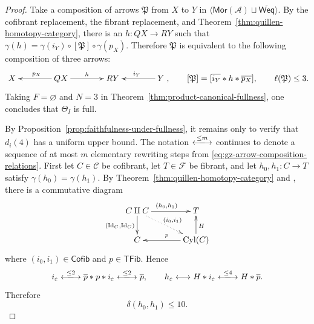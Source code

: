 \documentclass[10pt,a4paper]{amsart}
\theoremstyle{plain}
\theoremstyle{definition}
\theoremstyle{remark}
\begin{document}
\begin{proof}
  Take a composition of arrows $\mathfrak P$ from $X$ to $Y$ in $\langle\mathsf{Mor}(\mathcal A)\sqcup\overline{\mathsf{Weq}}\rangle$.
  By the cofibrant replacement, the fibrant replacement, and Theorem~\ref{thm:quillen-homotopy-category}, there is an $h:QX\longrightarrow RY$ such that $\gamma(h)=\gamma(i_Y)\circ[\mathfrak P]\circ\gamma(p_X)$.
  Therefore $\mathfrak P$ is equivalent to the following composition of three arrows:
  \[
    \xymatrix@C=14mm{
    X&
    QX\ar[l]_{p_X}\ar[r]^h&
    RY&
    Y\ar[l]_{i_Y}
    },
    \qquad
  [\mathfrak P]=[\overline{i_Y}\ast h\ast\overline{p_X}],
    \qquad
    \ell(\mathfrak P)\leq3.
  \]
  Taking $F=\varnothing$ and $N=3$ in Theorem~\ref{thm:product-canonical-fullness}, one concludes that $\Theta_I$ is full.

  \medskip

  By Proposition~\ref{prop:faithfulness-under-fullness}, it remains only to verify that $d_i(4)$ has a uniform upper bound.
  The notation $\xlongleftrightarrow{\leq m}$ continues to denote a sequence of at most $m$ elementary rewriting steps from \eqref{eq:gz-arrow-composition-relations}.
  First let $C \in \mathcal{C}$ be cofibrant, let $T \in \mathcal{F}$ be fibrant, and let $h_0,h_1:C\longrightarrow T$ satisfy $\gamma(h_0)=\gamma(h_1)$.
  By Theorem~\ref{thm:quillen-homotopy-category} and \cite[Lemma~4.6]{DwyerSpalinski}, there is a commutative diagram
  \[
    \xymatrix@C=12mm@R=7mm{
    C\amalg C\ar[r]^{(h_0, h_1)}\ar[d]_{(\operatorname{Id}_C, \operatorname{Id}_C)} \ar@{..>}[dr]^{(i_0, i_1)} &T\\
    C&\operatorname{Cyl}(C)\ar[u]_H\ar[l]_p
    }
  \]
  where $(i_0,i_1)\in\mathsf{Cofib}$ and $p\in \mathsf{TFib}$.
  Hence
  \[
    i_\varepsilon
    \xlongleftrightarrow{\leq2}
    \overline p\ast p\ast i_\varepsilon
    \xlongleftrightarrow{\leq2}\overline p,
    \qquad
    h_\varepsilon
    \longleftrightarrow H\ast i_\varepsilon
    \xlongleftrightarrow{\leq4}H\ast\overline p.
  \]
  Therefore
  \begin{equation}\label{eq:model-homotopy-rewriting}
    \delta(h_0,h_1)\leq10.
  \end{equation}

  \medskip


\end{proof}
\end{document}
